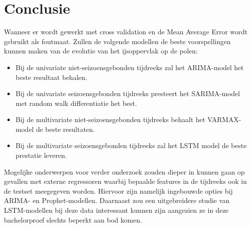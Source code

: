 
\chapter{Conclusie}
\label{ch:conclusie}


Wanneer er wordt gewerkt met cross validation en de Mean Average Error wordt gebruikt als foutmaat. Zullen de volgende modellen de beste voorspellingen kunnen maken van de evolutie van het ijsoppervlak op de polen:
\begin{itemize}
    \item Bij de univariate niet-seizoensgebonden tijdreeks zal het ARIMA-model het beste resultaat behalen.
    \item Bij de univariate seizoensgebonden tijdreeks presteert het SARIMA-model met random walk differentiatie het best.
    \item Bij de multivariate niet-seizoensgebonden tijdreeks behaalt het VARMAX-model de beste resultaten.
    \item Bij de multivariate seizoensgebonden tijdreeks zal het LSTM model de beste prestatie leveren.
\end{itemize}

Mogelijke onderwerpen voor verder onderzoek zouden dieper in kunnen gaan op gevallen met externe regressoren waarbij bepaalde features in de tijdreeks ook in de testset meegegeven worden. Hiervoor zijn namelijk ingebouwde opties bij ARIMA- en Prophet-modellen. Daarnaast zou een uitgebreidere studie van LSTM-modellen bij deze data interessant kunnen zijn aangezien ze in deze bachelorproef slechts beperkt aan bod komen.
